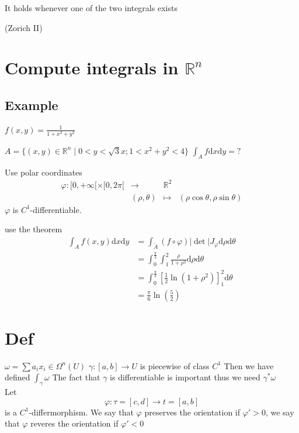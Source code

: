 \documentclass{book}
\newcommand{\abs}[1]{\left\lvert #1 \right\rvert}
\newcommand{\leftbracket}{[}
\begin{document}
It holds whenever one of the two integrals exists

(Zorich II)
\section{Compute integrals in $\mathbb{R}^n$}
\subsection{Example}
$f(x,y)=\frac{1}{1+x^2+y^2}$

$A=\{(x,y)\in \mathbb{R}^n\mid 0<y<\sqrt{3}x;1<x^2+y^2<4\}$
$\int_Af\text{d}x\text{d}y=?$

Use polar coordinates
$$\begin{aligned}
    \varphi:\leftbracket0,+\infty\leftbracket\times\leftbracket0,2\pi\leftbracket&\rightarrow&\mathbb{R}^2\\
    &(\rho,\theta)&\mapsto&(\rho\cos\theta,\rho\sin\theta)
\end{aligned}$$
$\varphi$ is $C^1$-differentiable.

use the theorem
$$
\begin{aligned}
    \int_Af(x,y)\text{d}x\text{d}y &=\int_{\tilde{A}}(f\circ\varphi)\abs\det J_\varphi\text{d}\rho\text{d}\theta\\
    &=\int_0^{\frac{\pi}3}\int_1^2\frac{\rho}{1+\rho^2}\text{d}\rho\text{d}\theta\\
    &=\int_0^{\frac{\pi}3}\left[\frac{1}2\ln(1+\rho^2)\right]^2_1\text{d}\theta\\
    &=\frac{\pi}6\ln(\frac{5}2)
\end{aligned}
$$
\section{Def}
$\omega=\sum a_ix_i\in \Omega^n(U)$ $\gamma:[a,b]\rightarrow U$ is piecewise of class $C^1$
Then we have defined $\int_\gamma\omega$ The fact that $\gamma$ is differentiable is important thus we need $\gamma^*\omega$\\
Let $$\varphi:\tau=[c,d]\rightarrow t=[a,b]$$ is a $C^1$-differmorphism. We say that $\varphi$ preserves the orientation if $\varphi'>0$, we say that $\varphi$ reveres the orientation if $\varphi'<0$
\end{document}
